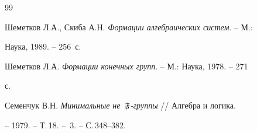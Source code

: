 \begin{thebibliography}{99}







Шеметков Л.А., Скиба А.Н. {\em Формации алгебраических систем}. -- М.:


Наука, 1989. -- 256~с.




Шеметков Л.А. {\em Формации конечных групп}. -- М.: Наука, 1978. -- 271


с.




Семенчук В.Н. {\em Минимальные не~$\frak F$-группы} // Алгебра и логика.


-- 1979. -- Т.\,18. -- \No\,3. -- С.\,348--382.





\end{thebibliography}





\vskip 2cm














\label{end}





